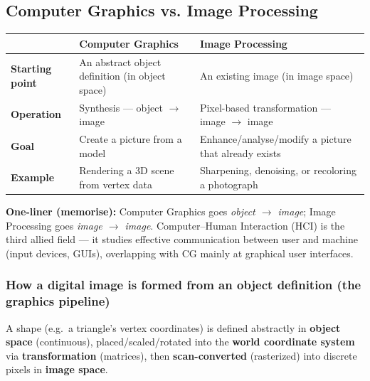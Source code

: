 \documentclass[12pt, a4paper]{article}
\newenvironment{answerbox}{\begin{mdframed}[style=answerframe]}{\end{mdframed}}
\begin{document}
\subsection{Computer Graphics vs. Image Processing}
\begin{center}
\renewcommand{\arraystretch}{1.4}
\begin{tabular}{p{4cm}|p{6cm}|p{6cm}}
\toprule
& \textbf{Computer Graphics} & \textbf{Image Processing} \\
\midrule
\textbf{Starting point} & An abstract object definition (in object space) & An existing image (in image space) \\
\textbf{Operation} & Synthesis --- object $\to$ image & Pixel-based transformation --- image $\to$ image \\
\textbf{Goal} & Create a picture from a model & Enhance/analyse/modify a picture that already exists \\
\textbf{Example} & Rendering a 3D scene from vertex data & Sharpening, denoising, or recoloring a photograph \\
\bottomrule
\end{tabular}
\end{center}
\begin{answerbox}
\textbf{One-liner (memorise):} Computer Graphics goes \emph{object $\to$ image}; Image Processing goes \emph{image $\to$ image}. Computer--Human Interaction (HCI) is the third allied field --- it studies effective communication between user and machine (input devices, GUIs), overlapping with CG mainly at graphical user interfaces.
\end{answerbox}

\subsubsection*{How a digital image is formed from an object definition (the graphics pipeline)}
\begin{center}
\end{center}
A shape (e.g.\ a triangle's vertex coordinates) is defined abstractly in \textbf{object space} (continuous), placed/scaled/rotated into the \textbf{world coordinate system} via \textbf{transformation} (matrices), then \textbf{scan-converted} (rasterized) into discrete pixels in \textbf{image space}.
\end{document}
